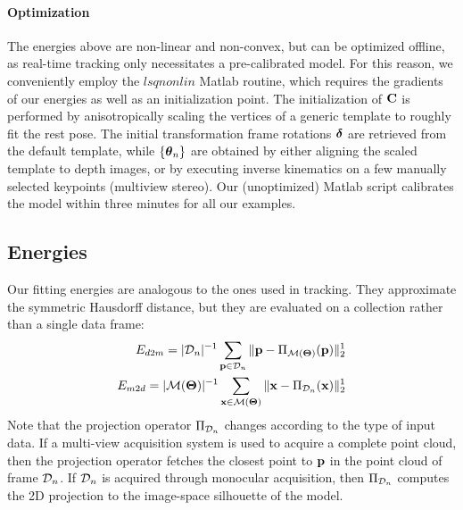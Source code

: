 
\paragraph{Optimization}
The energies above are non-linear and non-convex, but can be optimized offline, as real-time tracking only necessitates a pre-calibrated model. For this reason, we conveniently employ the $lsqnonlin$ Matlab routine, which requires the gradients of our energies as well as an initialization point.
The initialization of ${\mathbf{C}}$ is performed  by anisotropically scaling the vertices of a generic template to roughly fit the rest pose. The initial transformation frame rotations $\boldsymbol{\delta}$ are retrieved from the default template, while ${\{\boldsymbol{\theta}_n\}}$ are obtained by either aligning the scaled template to depth images, or by executing inverse kinematics on a few manually selected keypoints (multiview stereo).
Our (unoptimized) Matlab script calibrates the model within three minutes for all our examples.


\subsection{Energies}
Our fitting energies are analogous to the ones used in tracking. They approximate the symmetric Hausdorff distance, but they are evaluated on a collection rather than a single data frame:
% 
\begin{eqnarray}
E_{d2m} = |\mathcal{D}_n|^{-1} \sum_{\mathbf{p} \in \mathcal{D}_n} \| \mathbf{p} - \Pi_{\mathcal{M}(\boldsymbol{\Theta})}(\mathbf{p})\|_2^1 \\
E_{m2d} = |\mathcal{M}(\boldsymbol{\Theta})|^{-1} \sum_{\mathbf{x} \in \mathcal{M}(\boldsymbol{\Theta})} \| \mathbf{x} - \Pi_{\mathcal{D}_n}(\mathbf{x})\|_2^1
\end{eqnarray}
% 
Note that the projection operator $\Pi_{\mathcal{D}_n}$ changes according to the type of input data. If a multi-view acquisition system is used to acquire a complete point cloud, then the projection operator fetches the closest point to $\mathbf{p}$ in the point cloud of frame $\mathcal{D}_n$. If $\mathcal{D}_n$ is acquired through monocular acquisition, then $\Pi_{\mathcal{D}_n}$ computes the 2D projection to the image-space silhouette of the model.

